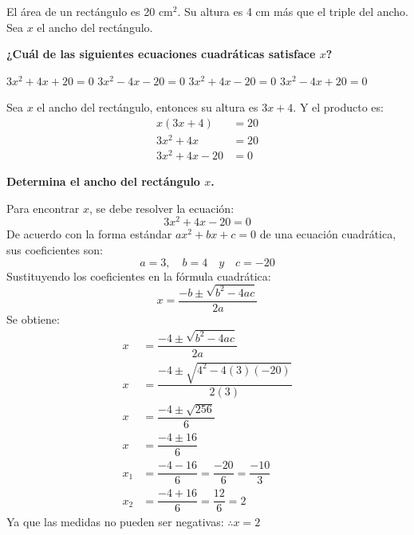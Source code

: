 El área de un rectángulo es 20 cm$^2$. Su altura es 4 cm más que el triple del ancho.
Sea $x$ el ancho del rectángulo.

\begin{subparts}
    \subpart \textbf{¿Cuál de las siguientes ecuaciones cuadráticas satisface $x$?}

    \begin{oneparchoices}
        \choice $3x^2+4x+20=0$
        \choice $3x^2-4x-20=0$
        \CorrectChoice $3x^2+4x-20=0$
        \choice $3x^2-4x+20=0$
    \end{oneparchoices}

    \begin{solutionbox}{3.5cm}
        Sea $x$ el ancho del rectángulo, entonces su altura es $3x+4$. Y el producto es:
        \begin{align*}
            x(3x+4)     & =20 \\
            3x^2+4x     & =20 \\
            3x^2+4x -20 & =0
        \end{align*}
    \end{solutionbox}

    \subpart \textbf{Determina el ancho del rectángulo $x$.}

    \begin{solutionbox}{14.8cm}
        Para encontrar $x$, se debe resolver la ecuación:
        \[
            3x^2+4x -20   =0
        \]
        De acuerdo con la forma estándar $ax^2 + bx + c = 0$ de una ecuación cuadrática, sus coeficientes son:
        \[            a=3, \quad b=4 \quad y \quad c=-20\]
        Sustituyendo los coeficientes en la fórmula cuadrática:
        \[x  = \dfrac{-b\pm\sqrt{b^2-4ac}}{2a} \]
        Se obtiene:
        \begin{align*}
            x   & = \dfrac{-4\pm\sqrt{b^2-4ac}}{2a}                \\[1.2em]
            x   & = \dfrac{-4\pm\sqrt{4^2-4(3)(-20)}}{2(3)}        \\[1.2em]
            x   & = \dfrac{-4\pm\sqrt{256}}{6}                     \\[1.2em]
            x   & = \dfrac{-4\pm 16}{6}                            \\[1.2em]
            x_1 & = \dfrac{-4-16}{6}=\dfrac{-20}{6}=\dfrac{-10}{3} \\[1.2em]
            x_2 & = \dfrac{-4+16}{6}=\dfrac{12}{6}= 2
        \end{align*}
        Ya que las medidas no pueden ser negativas:
        $\therefore x=2$
    \end{solutionbox}
\end{subparts}